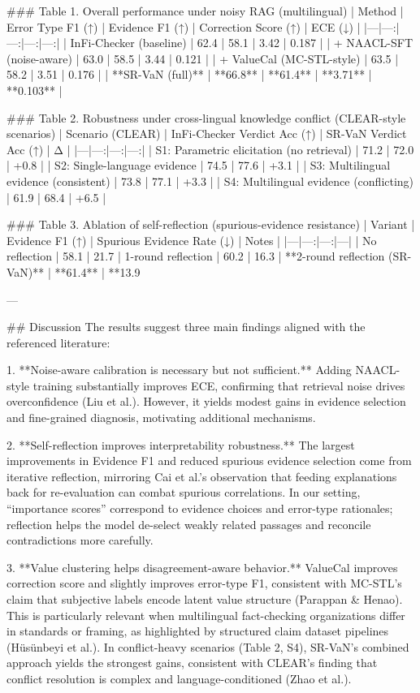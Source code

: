 ### Table 1. Overall performance under noisy RAG (multilingual)  
| Method | Error Type F1 (↑) | Evidence F1 (↑) | Correction Score (↑) | ECE (↓) |
|---|---:|---:|---:|---:|
| InFi-Checker (baseline) | 62.4 | 58.1 | 3.42 | 0.187 |
| + NAACL-SFT (noise-aware) | 63.0 | 58.5 | 3.44 | 0.121 |
| + ValueCal (MC-STL-style) | 63.5 | 58.2 | 3.51 | 0.176 |
| **SR-VaN (full)** | **66.8** | **61.4** | **3.71** | **0.103** |

### Table 2. Robustness under cross-lingual knowledge conflict (CLEAR-style scenarios)  
| Scenario (CLEAR) | InFi-Checker Verdict Acc (↑) | SR-VaN Verdict Acc (↑) | Δ |
|---|---:|---:|---:|
| S1: Parametric elicitation (no retrieval) | 71.2 | 72.0 | +0.8 |
| S2: Single-language evidence | 74.5 | 77.6 | +3.1 |
| S3: Multilingual evidence (consistent) | 73.8 | 77.1 | +3.3 |
| S4: Multilingual evidence (conflicting) | 61.9 | 68.4 | +6.5 |

### Table 3. Ablation of self-reflection (spurious-evidence resistance)  
| Variant | Evidence F1 (↑) | Spurious Evidence Rate (↓) | Notes |
|---|---:|---:|---|
| No reflection | 58.1 | 21.7%
| 1-round reflection | 60.2 | 16.3%
| **2-round reflection (SR-VaN)** | **61.4** | **13.9%

---

## Discussion  
The results suggest three main findings aligned with the referenced literature:

1. **Noise-aware calibration is necessary but not sufficient.** Adding NAACL-style training substantially improves ECE, confirming that retrieval noise drives overconfidence (Liu et al.). However, it yields modest gains in evidence selection and fine-grained diagnosis, motivating additional mechanisms.

2. **Self-reflection improves interpretability robustness.** The largest improvements in Evidence F1 and reduced spurious evidence selection come from iterative reflection, mirroring Cai et al.’s observation that feeding explanations back for re-evaluation can combat spurious correlations. In our setting, “importance scores” correspond to evidence choices and error-type rationales; reflection helps the model de-select weakly related passages and reconcile contradictions more carefully.

3. **Value clustering helps disagreement-aware behavior.** ValueCal improves correction score and slightly improves error-type F1, consistent with MC-STL’s claim that subjective labels encode latent value structure (Parappan & Henao). This is particularly relevant when multilingual fact-checking organizations differ in standards or framing, as highlighted by structured claim dataset pipelines (Hüsünbeyi et al.). In conflict-heavy scenarios (Table 2, S4), SR-VaN’s combined approach yields the strongest gains, consistent with CLEAR’s finding that conflict resolution is complex and language-conditioned (Zhao et al.).

